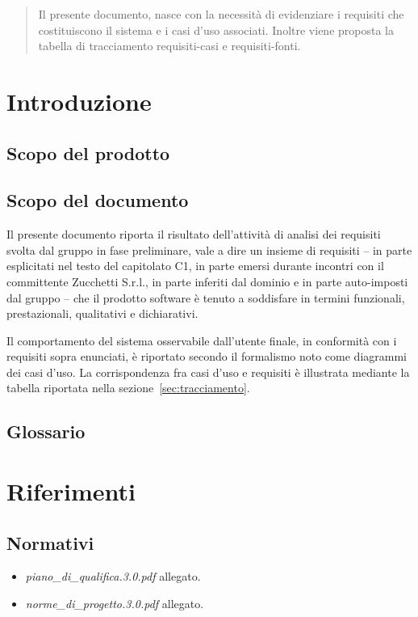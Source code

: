 \begin{abstract}
Il presente documento, nasce con la necessità di evidenziare i requisiti che costituiscono il sistema e i casi d'uso associati. Inoltre viene proposta la tabella di tracciamento requisiti-casi e requisiti-fonti.
\end{abstract}

\newpage

\section{Introduzione}
\subsection{Scopo del prodotto}
\purpose

\subsection{Scopo del documento}
Il presente documento riporta il risultato dell'attività di analisi dei requisiti svolta dal gruppo \team{} in fase preliminare, vale a dire un insieme di requisiti -- in parte esplicitati nel testo del capitolato C1, in parte emersi durante incontri con il committente Zucchetti S.r.l., in parte inferiti dal dominio e in parte auto-imposti dal gruppo -- che il prodotto software è tenuto a soddisfare in termini funzionali, prestazionali, qualitativi e dichiarativi.

Il comportamento del sistema osservabile dall'utente finale, in conformità con i requisiti sopra enunciati, è riportato secondo il formalismo noto come diagrammi dei casi d'uso. La corrispondenza fra casi d'uso e requisiti è illustrata mediante la tabella riportata nella sezione~\ref{sec:tracciamento}.

\subsection{Glossario}
\glossaryIntro

\clearpage
\section{Riferimenti}

\subsection{Normativi}
\begin{itemize}
\item[] \textit{piano\_di\_qualifica.3.0.pdf} allegato.
\item[] \textit{norme\_di\_progetto.3.0.pdf} allegato.
\end{itemize}

